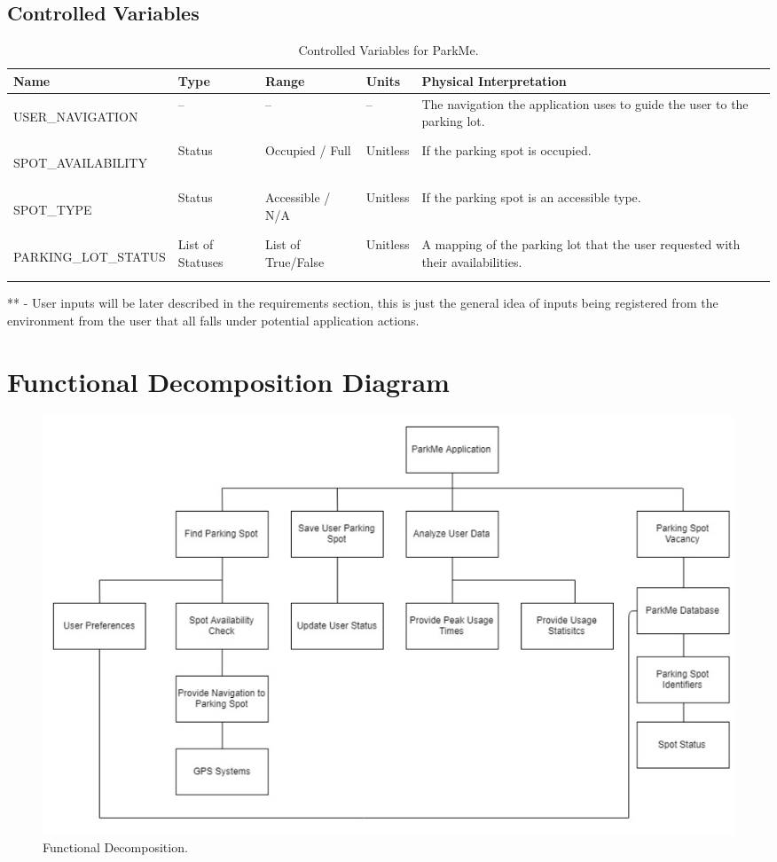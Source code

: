 \documentclass[]{article}
\begin{document}
\begin{table}
	\subsection{Controlled Variables}
	\begin{tabular}{ | m{5cm} | m{2cm}| m{1.5cm}| m{2cm}| m{3cm} |} 
		\hline
		Name & Type & Range & Units & Physical Interpretation \\ [0.5ex] 
		\hline
		\hypertarget{UNAV}{USER\_NAVIGATION} & -- & -- & -- & The navigation the application uses to guide the user to the parking lot. \\ 
		\hline
		\hypertarget{PSAVAIL}{SPOT\_AVAILABILITY} & Status & Occupied / Full & Unitless & If the parking  spot is occupied. \\
		\hline
		\hypertarget{PSTYPE}{SPOT\_TYPE} & Status & Accessible / N/A & Unitless & If the parking  spot is an  accessible type. \\
		\hline
		\hypertarget{PLSTAT}{PARKING\_LOT\_STATUS} & List of Statuses & List of True/False & Unitless & A mapping of the parking lot that the user requested with their availabilities. \\ 
		\hline 
	\end{tabular}
	\caption{Controlled Variables for ParkMe.}
	** - User inputs will be later described in the requirements section, this is just the general idea of inputs being registered from the environment from the user that all falls under potential application actions.
\end{table}



\section{Functional Decomposition Diagram}
\begin{figure}[H]
    \centering
    \includegraphics[width=\textwidth,height=\textheight,keepaspectratio]{fdd}
    \caption{Functional Decomposition.}
    \label{fig:fdd}
\end{figure}
\end{document}
